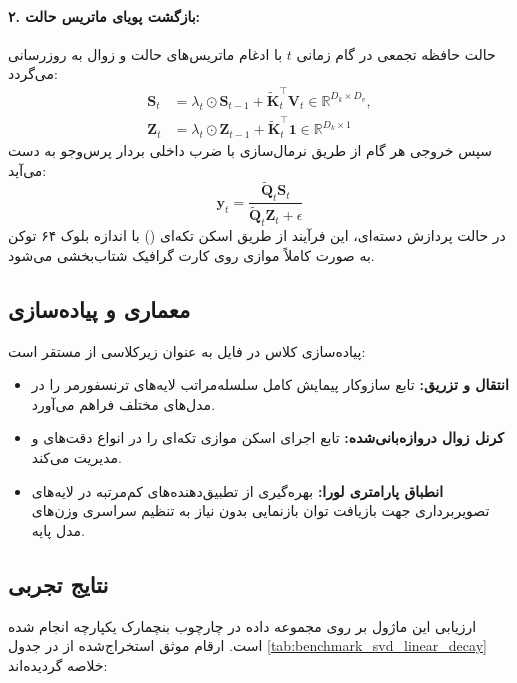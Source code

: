 \paragraph{۲. بازگشت پویای ماتریس حالت:}
حالت حافظه تجمعی در گام زمانی $t$ با ادغام ماتریس‌های حالت و زوال به روزرسانی می‌گردد:
\begin{align}
\mathbf{S}_t &= \lambda_t \odot \mathbf{S}_{t-1} + \tilde{\mathbf{K}}_t^\top \mathbf{V}_t \in \mathbb{R}^{D_k \times D_v}, \\
\mathbf{Z}_t &= \lambda_t \odot \mathbf{Z}_{t-1} + \tilde{\mathbf{K}}_t^\top \mathbf{1} \in \mathbb{R}^{D_k \times 1}
\end{align}
سپس خروجی هر گام از طریق نرمال‌سازی با ضرب داخلی بردار پرس‌وجو به دست می‌آید:
\begin{equation}
\mathbf{y}_t = \frac{\tilde{\mathbf{Q}}_t \mathbf{S}_t}{\tilde{\mathbf{Q}}_t \mathbf{Z}_t + \epsilon}
\end{equation}
در حالت پردازش دسته‌ای، این فرآیند از طریق اسکن تکه‌ای () با اندازه بلوک ۶۴ توکن به صورت کاملاً موازی روی کارت گرافیک شتاب‌بخشی می‌شود.

\subsection{معماری و پیاده‌سازی}
پیاده‌سازی کلاس  در فایل  به عنوان زیرکلاسی از  مستقر است:
\begin{itemize}
    \item \textbf{انتقال و تزریق:} تابع  سازوکار پیمایش کامل سلسله‌مراتب لایه‌های ترنسفورمر را در مدل‌های مختلف فراهم می‌آورد.
    \item \textbf{کرنل زوال دروازه‌بانی‌شده:} تابع  اجرای اسکن موازی تکه‌ای را در انواع دقت‌های  و  مدیریت می‌کند.
    \item \textbf{انطباق پارامتری لورا:} بهره‌گیری از تطبیق‌دهنده‌های کم‌مرتبه در لایه‌های تصویربرداری جهت بازیافت توان بازنمایی بدون نیاز به تنظیم سراسری وزن‌های مدل پایه.
\end{itemize}

\subsection{نتایج تجربی}
ارزیابی این ماژول بر روی مجموعه داده  در چارچوب بنچمارک یکپارچه انجام شده است. ارقام موثق استخراج‌شده از  در جدول \ref{tab:benchmark_svd_linear_decay} خلاصه گردیده‌اند:

